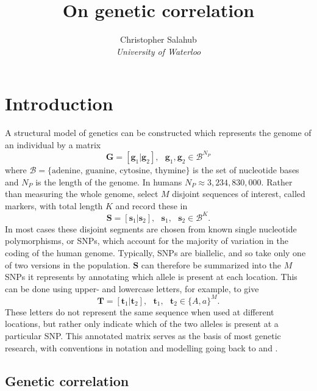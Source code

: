 \documentclass{article}
\title{On genetic correlation}
\author{Christopher Salahub \\
	\textit{University of Waterloo}}
\newcommand{\ve}[1]{\mathbf{#1}}           %
\newcommand{\m}[1]{\mathbf{#1}}               %
\begin{document}
	
\maketitle

\section{Introduction} \label{sec:intro}

A structural model of genetics can be constructed which represents the genome of an individual by a matrix
$$\m{G} = [\ve{g}_1| \ve{g}_2], \text{ } \ve{g}_1, \ve{g}_2 \in \mathcal{B}^{N_P}$$
where $\mathcal{B} = \{\text{adenine, guanine, cytosine, thymine}\}$ is the set of nucleotide bases and $N_P$ is the length of the genome. In humans $N_P \approx 3,234,830,000$. Rather than measuring the whole genome, select $M$ disjoint sequences of interest, called markers, with total length $K$ and record these in
$$\m{S} = [\ve{s}_1 | \ve{s}_2], \text{ } \ve{s}_1, \text{ } \ve{s}_2 \in \mathcal{B}^K.$$
In most cases these disjoint segments are chosen from known single nucleotide polymorphisms, or SNPs, which account for the majority of variation in the coding of the human genome. Typically, SNPs are biallelic, and so take only one of two versions in the population. $\m{S}$ can therefore be summarized into the $M$ SNPs it represents by annotating which allele is present at each location. This can be done using upper- and lowercase letters, for example, to give
$$\m{T} = [\ve{t}_1 | \ve{t}_2], \text{ } \ve{t}_1, \text{ } \ve{t}_2 \in \{A,a\}^M.$$
These letters do not represent the same sequence when used at different locations, but rather only indicate which of the two alleles is present at a particular SNP. This annotated matrix serves as the basis of most genetic research, with conventions in notation and modelling going back to \cite{mendel1866} and \cite{fisher1919}.

\subsection{Genetic correlation} \label{subsec:corr}
\end{document}
